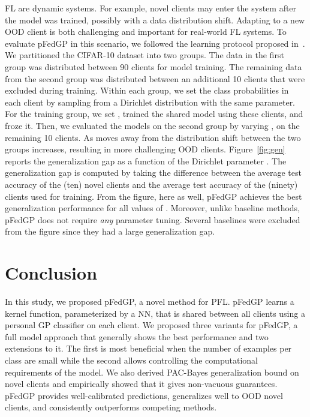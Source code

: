 \documentclass{article}
\begin{document}
FL are dynamic systems. For example, novel clients may enter the system after the model was trained, possibly with a data distribution shift. Adapting to a new OOD client is both challenging and important for real-world FL systems. To evaluate pFedGP in this scenario, we followed the learning protocol proposed in~\cite{shamsian2021personalized_icml}. We partitioned the CIFAR-10 dataset into two groups. The data in the first group was distributed between 90 clients for model training. The remaining data from the second group was distributed between an additional 10 clients that were excluded during training.
Within each group, we set the class probabilities in each client by sampling from a Dirichlet distribution with the same  parameter. For the training group, we set , trained the shared model using these clients, and froze it. Then, we evaluated the models on the second group by varying , on the remaining 10 clients. As  moves away from  the distribution shift between the two groups increases, resulting in more challenging OOD clients. Figure~\ref{fig:gen} reports the generalization gap as a function of the Dirichlet parameter . The generalization gap is computed by taking the difference between the average test accuracy of the (ten) novel clients and the average test accuracy of the (ninety) clients used for training. From the figure, here as well, pFedGP achieves the best generalization performance for all values of . Moreover, unlike baseline methods, pFedGP does not require \textit{any} parameter tuning. Several baselines were excluded from the figure since they had a large generalization gap. 

\vspace{-5pt}
\section{Conclusion} \label{sec:discussion}
\vspace{-10pt}
In this study, we proposed pFedGP, a novel method for PFL. pFedGP learns a kernel function, parameterized by a NN, that is shared between all clients using a personal GP classifier on each client. We proposed three variants for pFedGP, a full model approach that generally shows the best performance and two extensions to it. The first is most beneficial when the number of examples per class are small while the second allows controlling the computational requirements of the model. We also derived PAC-Bayes generalization bound on novel clients and empirically showed that it gives non-vacuous guarantees. pFedGP provides well-calibrated predictions, generalizes well to OOD novel clients, and consistently outperforms competing methods.
\end{document}
